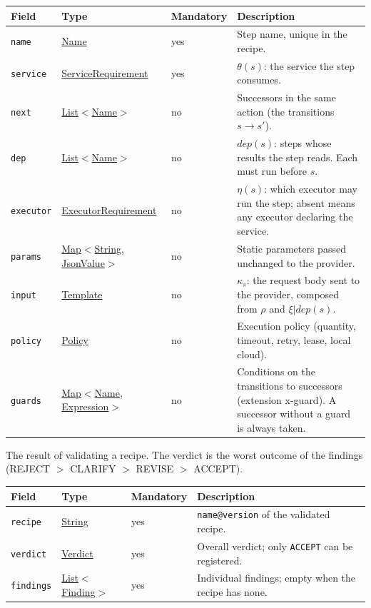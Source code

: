 \documentclass[a4paper]{arrowhead}
\newcommand{\mref}[1]{{\textcolor{ArrowheadPurple}{\hyperref[sec:model:#1]{#1}}}}
\newcommand{\pref}[1]{{\textcolor{ArrowheadGrey}{\hyperref[sec:model:primitives:#1]{#1}}}}
\begin{document}
{\small
\begin{longtable}{|p{3.7cm}|p{4.2cm}|p{1.6cm}|p{6.3cm}|}

\hline
\rowcolor{gray!33} Field & Type & Mandatory & Description \\ \hline
\endhead
\texttt{name} & \pref{Name} & yes & Step name, unique in the recipe. \\ \hline
\texttt{service} & \mref{ServiceRequirement} & yes & $\theta(s)$: the service the step consumes. \\ \hline
\texttt{next} & \pref{List}$<$\pref{Name}$>$ & no & Successors in the same action (the transitions $s \rightarrow s'$). \\ \hline
\texttt{dep} & \pref{List}$<$\pref{Name}$>$ & no & $dep(s)$: steps whose results the step reads. Each must run before $s$. \\ \hline
\texttt{executor} & \mref{ExecutorRequirement} & no & $\eta(s)$: which executor may run the step; absent means any executor declaring the service. \\ \hline
\texttt{params} & \pref{Map}$<$\pref{String}, \pref{JsonValue}$>$ & no & Static parameters passed unchanged to the provider. \\ \hline
\texttt{input} & \pref{Template} & no & $\kappa_s$: the request body sent to the provider, composed from $\rho$ and $\xi|dep(s)$. \\ \hline
\texttt{policy} & \mref{Policy} & no & Execution policy (quantity, timeout, retry, lease, local cloud). \\ \hline
\texttt{guards} & \pref{Map}$<$\pref{Name}, \pref{Expression}$>$ & no & Conditions on the transitions to successors (extension x-guard). A successor without a guard is always taken. \\ \hline
\end{longtable}
}

The result of validating a recipe. The verdict is the worst outcome of the findings (REJECT $>$ CLARIFY $>$ REVISE $>$ ACCEPT).

{\small
\begin{longtable}{|p{3.7cm}|p{4.2cm}|p{1.6cm}|p{6.3cm}|}

\hline
\rowcolor{gray!33} Field & Type & Mandatory & Description \\ \hline
\endhead
\texttt{recipe} & \pref{String} & yes & \texttt{name@version} of the validated recipe. \\ \hline
\texttt{verdict} & \mref{Verdict} & yes & Overall verdict; only \texttt{ACCEPT} can be registered. \\ \hline
\texttt{findings} & \pref{List}$<$\mref{Finding}$>$ & yes & Individual findings; empty when the recipe has none. \\ \hline
\end{longtable}
}
\end{document}
